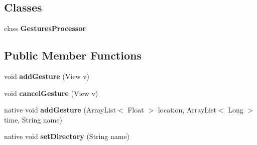 \subsection*{\-Classes}
\begin{DoxyCompactItemize}
\item 
class {\bfseries \-Gestures\-Processor}
\end{DoxyCompactItemize}
\subsection*{\-Public \-Member \-Functions}
\begin{DoxyCompactItemize}
\item 
\hypertarget{classcom_1_1openvision_1_1androidgesture_1_1CreateGestureActivity_ace3259b9154231c56e426e7656cf72b1}{void {\bfseries add\-Gesture} (\-View v)}\label{classcom_1_1openvision_1_1androidgesture_1_1CreateGestureActivity_ace3259b9154231c56e426e7656cf72b1}

\item 
\hypertarget{classcom_1_1openvision_1_1androidgesture_1_1CreateGestureActivity_a13fa4290af05a5f24ef199ba3f3a09f5}{void {\bfseries cancel\-Gesture} (\-View v)}\label{classcom_1_1openvision_1_1androidgesture_1_1CreateGestureActivity_a13fa4290af05a5f24ef199ba3f3a09f5}

\item 
\hypertarget{classcom_1_1openvision_1_1androidgesture_1_1CreateGestureActivity_a90e2124a75b62cafab20d7ab63e9aea0}{native void {\bfseries add\-Gesture} (\-Array\-List$<$ \-Float $>$ location, \-Array\-List$<$ \-Long $>$ time, \-String name)}\label{classcom_1_1openvision_1_1androidgesture_1_1CreateGestureActivity_a90e2124a75b62cafab20d7ab63e9aea0}

\item 
\hypertarget{classcom_1_1openvision_1_1androidgesture_1_1CreateGestureActivity_a8c50fec91db3e2b2f4cc066a8fad1dcf}{native void {\bfseries set\-Directory} (\-String name)}\label{classcom_1_1openvision_1_1androidgesture_1_1CreateGestureActivity_a8c50fec91db3e2b2f4cc066a8fad1dcf}

\end{DoxyCompactItemize}
